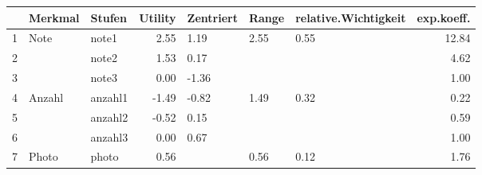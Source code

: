 \begin{table}[ht]
\centering
\begin{tabular}{rllrlllr}
  \hline
 & Merkmal & Stufen & Utility & Zentriert & Range & relative.Wichtigkeit & exp.koeff. \\ 
  \hline
1 & Note & note1 & 2.55 & 1.19 & 2.55 & 0.55 & 12.84 \\ 
  2 &  & note2 & 1.53 & 0.17 &  &  & 4.62 \\ 
  3 &  & note3 & 0.00 & -1.36 &  &  & 1.00 \\ 
  4 & Anzahl & anzahl1 & -1.49 & -0.82 & 1.49 & 0.32 & 0.22 \\ 
  5 &  & anzahl2 & -0.52 & 0.15 &  &  & 0.59 \\ 
  6 &  & anzahl3 & 0.00 & 0.67 &  &  & 1.00 \\ 
  7 & Photo & photo & 0.56 &  & 0.56 & 0.12 & 1.76 \\ 
   \hline
\end{tabular}
\end{table}
